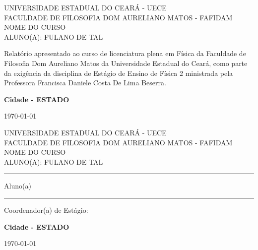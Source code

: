 \documentclass[a4paper, 12 pt]{article}                                	%
\begin{document}
	
	\newpage
	\begin{center}
		UNIVERSIDADE ESTADUAL DO CEARÁ - UECE\\ \vspace{0.5cm}
		FACULDADE DE FILOSOFIA DOM AURELIANO MATOS - FAFIDAM\\ \vspace{0.5cm}
		NOME DO CURSO \\ \vspace{0.5cm}
		ALUNO(A):\textnormal{ FULANO DE TAL} \\ \vspace{8cm}
		
		\begin{flushright}
			\hspace*{8cm}\parbox{8.5cm}{{Relatório apresentado ao curso de licenciatura plena em Física da Faculdade de Filosofia Dom Aureliano Matos da Universidade Estadual do Ceará, como parte da exigência da disciplina de Estágio de Ensino de Física 2 ministrada pela Professora Francisca Daniele Costa De Lima Beserra.}}
			
		\end{flushright}
		
		\vspace{8cm}
		\textbf{Cidade - ESTADO}
		
		\vspace{0.5cm}
		\today{}		%
	\end{center}
	\thispagestyle{empty}
	
	\newpage 
	
	\begin{center}
	UNIVERSIDADE ESTADUAL DO CEARÁ - UECE\\ \vspace{0.5cm}
	FACULDADE DE FILOSOFIA DOM AURELIANO MATOS - FAFIDAM\\ \vspace{0.5cm}
	NOME DO CURSO \\ \vspace{0.5cm}
	ALUNO(A):\textnormal{ FULANO DE TAL} \\ \vspace{5cm}
		
		\rule{15 cm}{0.008 cm}
		Aluno(a)
		
		\vspace{5 cm}
		
		\rule{15 cm}{0.008 cm}
		Coordenador(a) de Estágio: %
		
		\vspace{9 cm}
		\textbf{Cidade - ESTADO}
		
		\today{}			%
		
	\end{center}
	\thispagestyle{empty}
	
\end{document}
